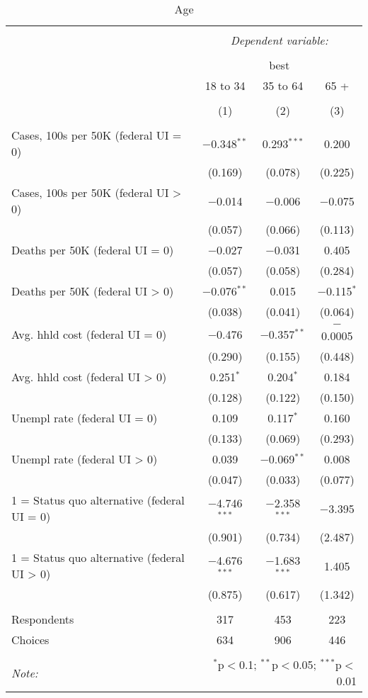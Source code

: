 
\begin{table}[!htbp] \centering 
  \caption{Age} 
  \label{} 
\begin{tabular}{@{\extracolsep{5pt}}lccc} 
\\[-1.8ex]\hline 
\hline \\[-1.8ex] 
 & \multicolumn{3}{c}{\textit{Dependent variable:}} \\ 
\cline{2-4} 
\\[-1.8ex] & \multicolumn{3}{c}{best} \\ 
 & 18 to 34 & 35 to 64 & 65 + \\ 
\\[-1.8ex] & (1) & (2) & (3)\\ 
\hline \\[-1.8ex] 
 Cases, 100s per 50K (federal UI = 0) & $-$0.348$^{**}$ & 0.293$^{***}$ & 0.200 \\ 
  & (0.169) & (0.078) & (0.225) \\ 
  Cases, 100s per 50K (federal UI > 0) & $-$0.014 & $-$0.006 & $-$0.075 \\ 
  & (0.057) & (0.066) & (0.113) \\ 
  Deaths per 50K (federal UI = 0) & $-$0.027 & $-$0.031 & 0.405 \\ 
  & (0.057) & (0.058) & (0.284) \\ 
  Deaths per 50K (federal UI > 0) & $-$0.076$^{**}$ & 0.015 & $-$0.115$^{*}$ \\ 
  & (0.038) & (0.041) & (0.064) \\ 
  Avg. hhld cost (federal UI = 0) & $-$0.476 & $-$0.357$^{**}$ & $-$0.0005 \\ 
  & (0.290) & (0.155) & (0.448) \\ 
  Avg. hhld cost (federal UI > 0) & 0.251$^{*}$ & 0.204$^{*}$ & 0.184 \\ 
  & (0.128) & (0.122) & (0.150) \\ 
  Unempl rate (federal UI = 0) & 0.109 & 0.117$^{*}$ & 0.160 \\ 
  & (0.133) & (0.069) & (0.293) \\ 
  Unempl rate (federal UI > 0) & 0.039 & $-$0.069$^{**}$ & 0.008 \\ 
  & (0.047) & (0.033) & (0.077) \\ 
  1 = Status quo alternative (federal UI = 0) & $-$4.746$^{***}$ & $-$2.358$^{***}$ & $-$3.395 \\ 
  & (0.901) & (0.734) & (2.487) \\ 
  1 = Status quo alternative (federal UI > 0) & $-$4.676$^{***}$ & $-$1.683$^{***}$ & 1.405 \\ 
  & (0.875) & (0.617) & (1.342) \\ 
 \hline \\[-1.8ex] 
Respondents & 317 & 453 & 223\\ 
 Choices & 634 & 906 & 446\\ 
\hline 
\hline \\[-1.8ex] 
\textit{Note:}  & \multicolumn{3}{r}{$^{*}$p$<$0.1; $^{**}$p$<$0.05; $^{***}$p$<$0.01} \\ 
\end{tabular} 
\end{table} 
